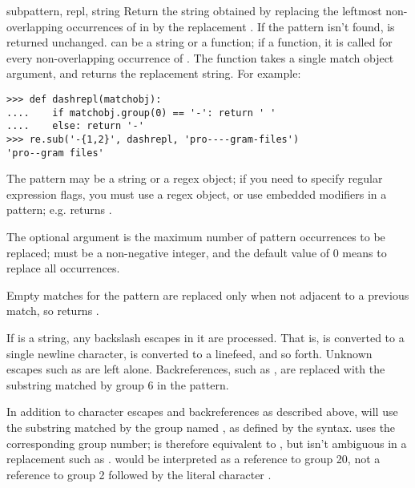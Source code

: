 \begin{funcdesc}{sub}{pattern, repl, string}
Return the string obtained by replacing the leftmost non-overlapping
occurrences of  in  by the replacement
.  If the pattern isn't found,  is returned
unchanged.   can be a string or a function; if a function,
it is called for every non-overlapping occurrence of .
The function takes a single match object argument, and returns the
replacement string.  For example:

\begin{verbatim}
>>> def dashrepl(matchobj):
....    if matchobj.group(0) == '-': return ' '
....    else: return '-'
>>> re.sub('-{1,2}', dashrepl, 'pro----gram-files')
'pro--gram files'
\end{verbatim}

The pattern may be a string or a 
regex object; if you need to specify
regular expression flags, you must use a regex object, or use
embedded modifiers in a pattern; e.g.
 returns .

The optional argument  is the maximum number of pattern
occurrences to be replaced;  must be a non-negative integer, and
the default value of 0 means to replace all occurrences.

Empty matches for the pattern are replaced only when not adjacent to a
previous match, so  returns .

If  is a string, any backslash escapes in it are processed.
That is,  is converted to a single newline character,
 is converted to a linefeed, and so forth.  Unknown escapes
such as  are left alone.  Backreferences, such as , are
replaced with the substring matched by group 6 in the pattern. 

In addition to character escapes and backreferences as described
above,  will use the substring matched by the group
named , as defined by the  syntax.
 uses the corresponding group number;  is therefore equivalent to , but isn't ambiguous in a
replacement such as .   would be
interpreted as a reference to group 20, not a reference to group 2
followed by the literal character .  
\end{funcdesc}

